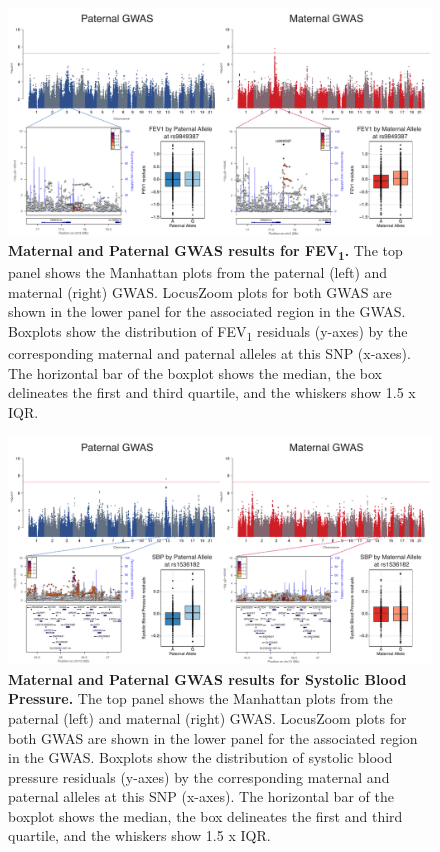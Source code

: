 \begin{figure}[!htb]
\centering
\includegraphics[width=5in]{img/ch02/fig-s4.pdf}
\caption[Maternal and Paternal GWAS results for FEV\textsubscript{1}.]{\textbf{Maternal and Paternal GWAS results for FEV\textsubscript{1}.}  The top panel shows the Manhattan plots from the paternal (left) and maternal (right) GWAS. LocusZoom plots for both GWAS are shown in the lower panel for the associated region in the GWAS. Boxplots show the distribution of FEV\textsubscript{1} residuals (y-axes) by the corresponding maternal and paternal alleles at this SNP (x-axes). The horizontal bar of the boxplot shows the median, the box delineates the first and third quartile, and the whiskers show 1.5 x IQR.}
\label{fig:fig-s4}
\end{figure}




\begin{figure}[!htb]
\centering
\includegraphics[width=5in]{img/ch02/fig-s5.pdf}
\caption[Maternal and Paternal GWAS results for Systolic Blood Pressure.]{\textbf{Maternal and Paternal GWAS results for Systolic Blood Pressure.}  The top panel shows the Manhattan plots from the paternal (left) and maternal (right) GWAS. LocusZoom plots for both GWAS are shown in the lower panel for the associated region in the GWAS. Boxplots show the distribution of systolic blood pressure residuals (y-axes) by the corresponding maternal and paternal alleles at this SNP (x-axes). The horizontal bar of the boxplot shows the median, the box delineates the first and third quartile, and the whiskers show 1.5 x IQR.}
\label{fig:fig-s5}
\end{figure}




